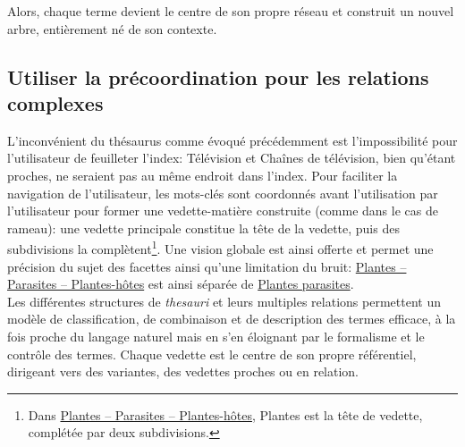 Alors, chaque terme devient le centre de son propre réseau et construit un nouvel arbre, entièrement né de son contexte.


\subsection{\label{I-C-2-c}Utiliser la précoordination pour les relations complexes}

L'inconvénient du thésaurus comme évoqué précédemment est l'impossibilité pour l'utilisateur de feuilleter l'index: \og Télévision\fg{} et \og Chaînes de télévision\fg{}, bien qu'étant proches, ne seraient pas au même endroit dans l'index. Pour faciliter la navigation de l'utilisateur, les mots-clés sont coordonnés avant l'utilisation par l'utilisateur pour former une vedette-matière construite (comme dans le cas de \ac{rameau}): une vedette principale constitue la tête de la vedette, puis des subdivisions la complètent\footnote{Dans \og \href{https://data.bnf.fr/fr/11977461/plantes-hotes/}{Plantes -- Parasites -- Plantes-hôtes}\fg{}, \og Plantes\fg{} est la tête de vedette, complétée par deux subdivisions.}. Une vision globale est ainsi offerte et permet une précision du sujet des facettes ainsi qu'une limitation du bruit: \href{https://data.bnf.fr/fr/11977461/plantes-hotes/}{Plantes -- Parasites -- Plantes-hôtes}\fg{} est ainsi séparée de \href{https://data.bnf.fr/fr/12397201/plantes_parasites/}{\og Plantes parasites\fg{}}.\\

\bigskip
Les différentes structures de \textit{thesauri} et leurs multiples relations permettent un modèle de classification, de combinaison et de description des termes efficace, à la fois proche du langage naturel mais en s'en éloignant par le formalisme et le contrôle des termes. Chaque vedette est le centre de son propre référentiel, dirigeant vers des variantes, des vedettes proches ou en relation.

